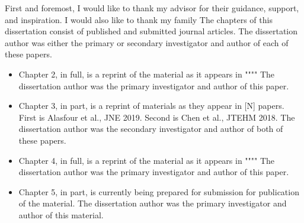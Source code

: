 	First and foremost, I would like to thank my advisor for their guidance, support, and inspiration.
	I would also like to thank my family
	The chapters of this dissertation consist of published and submitted journal articles.
	The dissertation author was either the primary or secondary investigator and author of each of these papers.
\begin{itemize}

	\item Chapter 2, in full, is a reprint of the material as it appears in """"
	The dissertation author was the primary investigator and author of this paper. 

	\item Chapter 3, in part, is a reprint of materials as they appear in [N] papers. First is Alasfour et al., JNE 2019. Second is Chen et al., JTEHM 2018. 
	The dissertation author was the secondary investigator and author of both of these papers. 

	\item Chapter 4, in full, is a reprint of the material as it appears in """" 
	The dissertation author was the primary investigator and author of this paper.

	\item Chapter 5, in part, is currently being prepared for submission for publication of the material.  
	The dissertation author was the primary investigator and author of this material.
\end{itemize}	